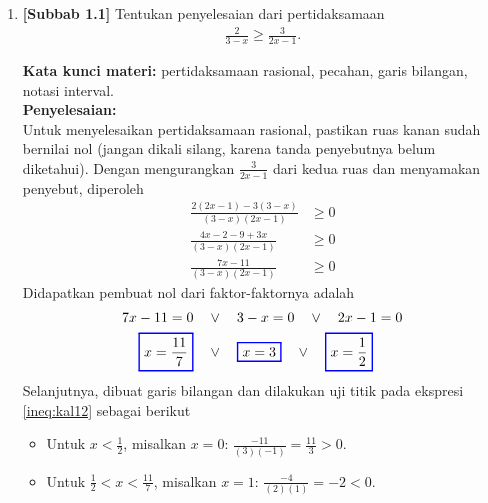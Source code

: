 \documentclass[10pt,openany,a4paper]{article}
\theoremstyle{definition}
\theoremstyle{definition}
\theoremstyle{plain}
\newenvironment{jawab}[2][tes]{%
\par\noindent\textbf{Kata kunci materi:} #1.\\
\textbf{Penyelesaian:} #2%
}{}
\begin{document}
\begin{enumerate}
    \item \textbf{[Subbab 1.1]} Tentukan penyelesaian dari pertidaksamaan
    \begin{align*}
        \frac{2}{3-x}\geq\frac{3}{2x-1}.
    \end{align*}
    \begin{jawab}[pertidaksamaan rasional, pecahan, garis bilangan, notasi interval]{~\\
        Untuk menyelesaikan pertidaksamaan rasional, pastikan ruas kanan sudah bernilai nol (jangan dikali silang, karena tanda penyebutnya belum diketahui). Dengan mengurangkan \(\frac{3}{2x-1}\) dari kedua ruas dan menyamakan penyebut, diperoleh
        \begin{align}
            \frac{2(2x-1)-3(3-x)}{(3-x)(2x-1)} &\geq 0\nonumber\\
            \frac{4x-2-9+3x}{(3-x)(2x-1)} &\geq 0\nonumber\\
            \frac{7x-11}{(3-x)(2x-1)} &\geq 0 \label{ineq:kal12}
        \end{align}
        Didapatkan pembuat nol dari faktor-faktornya adalah
        \begin{align*}
            7x-11 = 0 \quad &\vee\quad  3-x = 0 \quad\vee\quad 2x-1=0\\
            \colorlet{oldcolor}{.}
        \color{blue}
        \setlength{\fboxrule}{1pt} \boxed{\color{oldcolor}x=\frac{11}{7}}\color{oldcolor} \quad &\vee\quad \colorlet{oldcolor}{.}
        \color{blue}
        \setlength{\fboxrule}{1pt} \boxed{\color{oldcolor}x=3}\color{oldcolor} \quad\vee\quad \colorlet{oldcolor}{.}
        \color{blue}
        \setlength{\fboxrule}{1pt} \boxed{\color{oldcolor}x=\frac{1}{2}}\color{oldcolor}
        \end{align*}
        Selanjutnya, dibuat garis bilangan dan dilakukan uji titik pada ekspresi \eqref{ineq:kal12} sebagai berikut
        \begin{itemize}
            \item Untuk \(x < \frac{1}{2}\), misalkan \(x = 0\): $\displaystyle\frac{-11}{(3)(-1)} = \frac{11}{3} > 0$.
            \item Untuk \(\frac{1}{2} < x < \frac{11}{7}\), misalkan \(x = 1\): $\displaystyle\frac{-4}{(2)(1)} = -2 < 0$.

\end{itemize}}
\end{jawab}
\end{enumerate}
\end{document}

